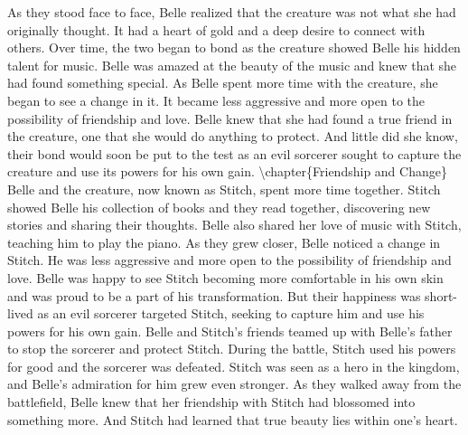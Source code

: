 \documentclass{book}%
\begin{document}
\newline%
As they stood face to face, Belle realized that the creature was not what she had originally thought. It had a heart of gold and a deep desire to connect with others.\newline%
\newline%
Over time, the two began to bond as the creature showed Belle his hidden talent for music. Belle was amazed at the beauty of the music and knew that she had found something special.\newline%
\newline%
As Belle spent more time with the creature, she began to see a change in it. It became less aggressive and more open to the possibility of friendship and love.\newline%
\newline%
Belle knew that she had found a true friend in the creature, one that she would do anything to protect. And little did she know, their bond would soon be put to the test as an evil sorcerer sought to capture the creature and use its powers for his own gain.%
\textbackslash{}chapter\{Friendship and Change\}\newline%
\newline%
Belle and the creature, now known as Stitch, spent more time together. Stitch showed Belle his collection of books and they read together, discovering new stories and sharing their thoughts. Belle also shared her love of music with Stitch, teaching him to play the piano.\newline%
\newline%
As they grew closer, Belle noticed a change in Stitch. He was less aggressive and more open to the possibility of friendship and love. Belle was happy to see Stitch becoming more comfortable in his own skin and was proud to be a part of his transformation.\newline%
\newline%
But their happiness was short{-}lived as an evil sorcerer targeted Stitch, seeking to capture him and use his powers for his own gain. Belle and Stitch's friends teamed up with Belle's father to stop the sorcerer and protect Stitch.\newline%
\newline%
During the battle, Stitch used his powers for good and the sorcerer was defeated. Stitch was seen as a hero in the kingdom, and Belle's admiration for him grew even stronger. As they walked away from the battlefield, Belle knew that her friendship with Stitch had blossomed into something more. And Stitch had learned that true beauty lies within one's heart.%
\end{document}
